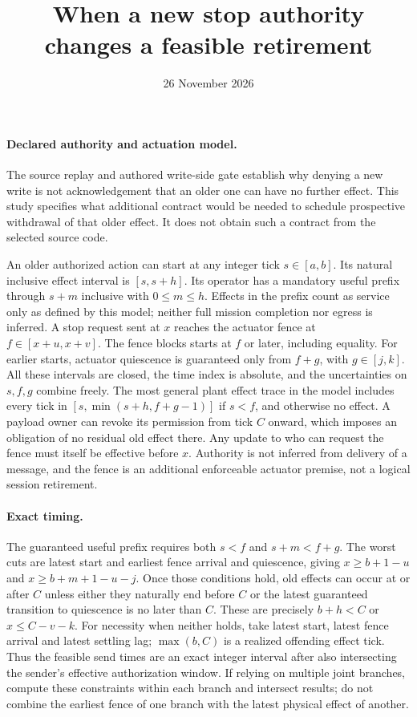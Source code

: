 \documentclass[11pt]{article}
\title{When a new stop authority changes a feasible retirement}
\date{26 November 2026}
\begin{document}
\maketitle
\paragraph{Declared authority and actuation model.}
The source replay and authored write-side gate establish why denying
a new write is not acknowledgement that an older one can have no
further effect. This study specifies what additional contract would
be needed to schedule prospective withdrawal of that older effect.
It does not obtain such a contract from the selected source code.

An older authorized action can start at any integer tick
$s\in[a,b]$. Its natural inclusive effect interval is $[s,s+h]$.
Its operator has a mandatory useful prefix through $s+m$ inclusive
with $0\le m\le h$. Effects in the prefix count as service only
as defined by this model; neither full mission completion nor
egress is inferred. A stop request sent at $x$ reaches the
actuator fence at $f\in[x+u,x+v]$. The fence blocks starts at
$f$ or later, including equality. For earlier starts, actuator
quiescence is guaranteed only from $f+g$, with $g\in[j,k]$.
All these intervals are closed, the time index is absolute,
and the uncertainties on $s,f,g$ combine freely. The most general
plant effect trace in the model includes every tick in
$[s,\min(s+h,f+g-1)]$ if $s<f$, and otherwise no effect.
A payload owner can revoke its permission from tick $C$ onward,
which imposes an obligation of no residual old effect there.
Any update to who can request the fence must itself be effective
before $x$. Authority is not inferred from delivery of a message,
and the fence is an additional enforceable actuator premise,
not a logical session retirement.

\paragraph{Exact timing.}
The guaranteed useful prefix requires both $s<f$ and
$s+m<f+g$. The worst cuts are latest start and earliest fence
arrival and quiescence, giving
$x\ge b+1-u$ and $x\ge b+m+1-u-j$.
Once those conditions hold, old effects can occur at or after
$C$ unless either they naturally end before $C$ or the
latest guaranteed transition to quiescence is no later than
$C$. These are precisely $b+h<C$ or $x\le C-v-k$.
For necessity when neither holds, take latest start, latest
fence arrival and latest settling lag; $\max(b,C)$ is a
realized offending effect tick. Thus the feasible send times
are an exact integer interval after also intersecting the
sender's effective authorization window. If relying on multiple
joint branches, compute these constraints within each branch
and intersect results; do not combine the earliest fence of
one branch with the latest physical effect of another.
\end{document}

